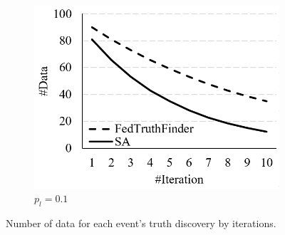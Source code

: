 \begin{figure}[t!]
\begin{subfigure}[t]{.325\linewidth}
			\includegraphics[width=1\linewidth]{./fig/data_num_cl0.1.PNG}
			\caption{$p_l=0.1$}
			\label{fig:dc}
		\end{subfigure}
		\caption{Number of data for each event's truth discovery by iterations.}
		\label{fig:num_sensed_data}
\end{figure}

